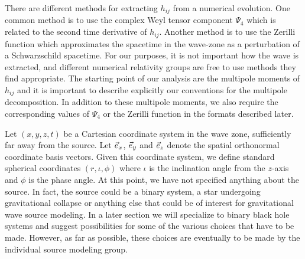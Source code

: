 \documentclass[10pt]{ligodcc}
\begin{document}
There are different methods for extracting $h_{ij}$ from a numerical
evolution.  One common method is to use the complex Weyl tensor
component $\Psi_4$ which is related to the second time derivative of
$h_{ij}$. Another method is to use the Zerilli function which
approximates the spacetime in the wave-zone as a perturbation of a
Schwarzschild spacetime.  For our purposes, it is not important how
the wave is extracted, and different numerical relativity groups are
free to use methods they find appropriate.  The starting point of our
analysis are the multipole moments of $h_{ij}$ and it is important to
describe explicitly our conventions for the multipole decomposition.
In addition to these multipole moments, we also require the
corresponding values of $\Psi_4$ or the Zerilli function in the
formats described later.

Let $(x,y,z,t)$ be a Cartesian coordinate system in the wave zone,
sufficiently far away from the source. Let $\vec{e}_x$, $\vec{e}_y$ and
$\vec{e}_z$ denote the spatial orthonormal coordinate basis vectors.
Given this coordinate system, we define standard spherical coordinates
$(r,\iota,\phi)$ where $\iota$ is the inclination angle from the
$z$-axis and $\phi$ is the phase angle.  At this point, we have not
specified anything about the source.  In fact, the source could be a
binary system, a star undergoing gravitational collapse or anything
else that could be of interest for gravitational wave source modeling.
In a later section we will specialize to binary black hole systems and
suggest possibilities for some of the various choices that have to be
made.  However, as far as possible, these choices are eventually to be
made by the individual source modeling group.
\end{document}
